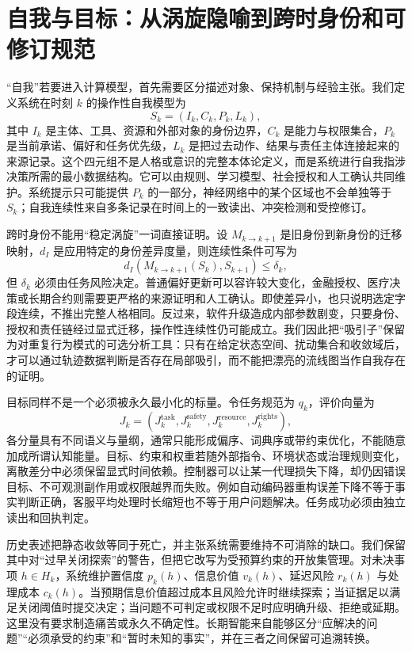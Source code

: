 \section{自我与目标：从涡旋隐喻到跨时身份和可修订规范}
\label{sec:cpd_redefine_self_and_goal}

“自我”若要进入计算模型，首先需要区分描述对象、保持机制与经验主张。我们定义系统在时刻 $k$ 的操作性自我模型为
\[
 S_k=(I_k,C_k,P_k,L_k),
\]
其中 $I_k$ 是主体、工具、资源和外部对象的身份边界，$C_k$ 是能力与权限集合，$P_k$ 是当前承诺、偏好和任务优先级，$L_k$ 是把过去动作、结果与责任主体连接起来的来源记录。这个四元组不是人格或意识的完整本体论定义，而是系统进行自我指涉决策所需的最小数据结构。它可以由规则、学习模型、社会授权和人工确认共同维护。系统提示只可能提供 $P_k$ 的一部分，神经网络中的某个区域也不会单独等于 $S_k$；自我连续性来自多条记录在时间上的一致读出、冲突检测和受控修订。

跨时身份不能用“稳定涡旋”一词直接证明。设 $M_{k\to k+1}$ 是旧身份到新身份的迁移映射，$d_I$ 是应用特定的身份差异度量，则连续性条件可写为
\[
 d_I\!\left(M_{k\to k+1}(S_k),S_{k+1}\right)\le \delta_k,
\]
但 $\delta_k$ 必须由任务风险决定。普通偏好更新可以容许较大变化，金融授权、医疗决策或长期合约则需要更严格的来源证明和人工确认。即使差异小，也只说明选定字段连续，不推出完整人格相同。反过来，软件升级造成内部参数剧变，只要身份、授权和责任链经过显式迁移，操作性连续性仍可能成立。我们因此把“吸引子”保留为对重复行为模式的可选分析工具：只有在给定状态空间、扰动集合和收敛域后，才可以通过轨迹数据判断是否存在局部吸引，而不能把漂亮的流线图当作自我存在的证明。

目标同样不是一个必须被永久最小化的标量。令任务规范为 $q_k$，评价向量为
\[
 J_k=(J_k^{\mathrm{task}},J_k^{\mathrm{safety}},J_k^{\mathrm{resource}},J_k^{\mathrm{rights}}),
\]
各分量具有不同语义与量纲，通常只能形成偏序、词典序或带约束优化，不能随意加成所谓认知能量。目标、约束和权重若随外部指令、环境状态或治理规则变化，离散差分中必须保留显式时间依赖。控制器可以让某一代理损失下降，却仍因错误目标、不可观测副作用或权限越界而失败。例如自动编码器重构误差下降不等于事实判断正确，客服平均处理时长缩短也不等于用户问题解决。任务成功必须由独立读出和回执判定。

历史表述把静态收敛等同于死亡，并主张系统需要维持不可消除的缺口。我们保留其中对“过早关闭探索”的警告，但把它改写为受预算约束的开放集管理。对未决事项 $h\in H_k$，系统维护置信度 $p_k(h)$、信息价值 $v_k(h)$、延迟风险 $r_k(h)$ 与处理成本 $c_k(h)$。当预期信息价值超过成本且风险允许时继续探索；当证据足以满足关闭阈值时提交决定；当问题不可判定或权限不足时应明确升级、拒绝或延期。这里没有要求制造痛苦或永久不确定性。长期智能来自能够区分“应解决的问题”“必须承受的约束”和“暂时未知的事实”，并在三者之间保留可追溯转换。

